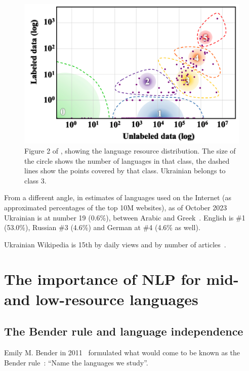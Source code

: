 \begin{figure}[t]
\centering
\includegraphics[width=1.0\linewidth]{Figures/Pasted image 20231030165827.png}
\decoRule
\caption[Language resource distribution]{Figure 2 of \cite{inclusion}, showing the language resource distribution. The size of the circle shows the number of languages in that class, the dashed lines show the points covered by that class. Ukrainian belongs to class 3.
}
\label{fig:bender}
\end{figure}

From a different angle, 
in estimates of languages used on the
Internet (as approximated percentages of the top 10M websites), as of
October 2023 Ukrainian is at number 19 (0.6\%), between Arabic and
Greek~\cite{enwiki:1182341232}. English is \#1
(53.0\%), Russian \#3 (4.6\%) and German at \#4 (4.6\% as well).

Ukrainian Wikipedia is 15th by daily views and by number of
articles~\cite{wiki:xxx}.
 
\section{The importance of NLP for mid- and low-resource
languages}\label{the-importance-of-nlp-for-mid--and-low-resource-languages}

\subsection{The Bender rule and language
independence}\label{the-bender-rule-and-language-independence}

Emily M. Bender in 2011~\cite{bender} formulated what would come to be
known as the Bender rule~\cite{benderpost}: ``Name the languages we
study''.

